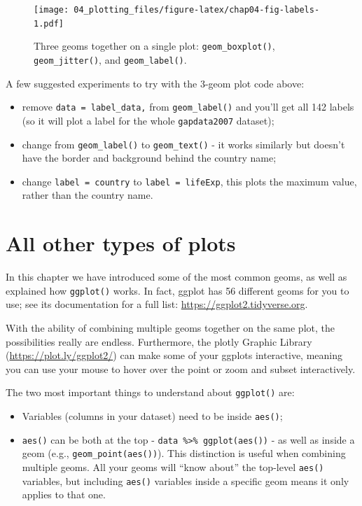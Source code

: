 \documentclass[
  12pt,
  krantz2]{krantz}
\providecommand{\tightlist}{%
  \setlength{\itemsep}{0pt}\setlength{\parskip}{0pt}}
\begin{document}
\begin{figure}
\centering
\texttt{[image: 04\_plotting\_files/figure-latex/chap04-fig-labels-1.pdf]}
\caption{\label{fig:chap04-fig-labels}Three geoms together on a single plot: \texttt{geom\_boxplot()}, \texttt{geom\_jitter()}, and \texttt{geom\_label()}.}
\end{figure}

A few suggested experiments to try with the 3-geom plot code above:

\begin{itemize}
\tightlist
\item
  remove \texttt{data\ =\ label\_data,} from \texttt{geom\_label()} and you'll get all 142 labels (so it will plot a label for the whole \texttt{gapdata2007} dataset);
\item
  change from \texttt{geom\_label()} to \texttt{geom\_text()} - it works similarly but doesn't have the border and background behind the country name;
\item
  change \texttt{label\ =\ country} to \texttt{label\ =\ lifeExp}, this plots the maximum value, rather than the country name.
\end{itemize}

\hypertarget{all-other-types-of-plots}{%
\section{All other types of plots}\label{all-other-types-of-plots}}

In this chapter we have introduced some of the most common geoms, as well as explained how \texttt{ggplot()} works.
In fact, ggplot has 56 different geoms for you to use; see its documentation for a full list: \url{https://ggplot2.tidyverse.org}.

With the ability of combining multiple geoms together on the same plot, the possibilities really are endless.
Furthermore, the plotly Graphic Library (\url{https://plot.ly/ggplot2/}) can make some of your ggplots interactive, meaning you can use your mouse to hover over the point or zoom and subset interactively.

The two most important things to understand about \texttt{ggplot()} are:

\begin{itemize}
\tightlist
\item
  Variables (columns in your dataset) need to be inside \texttt{aes()};
\item
  \texttt{aes()} can be both at the top - \texttt{data\ \%\textgreater{}\%\ ggplot(aes())} - as well as inside a geom (e.g., \texttt{geom\_point(aes())}).
  This distinction is useful when combining multiple geoms.
  All your geoms will ``know about'' the top-level \texttt{aes()} variables, but including \texttt{aes()} variables inside a specific geom means it only applies to that one.
\end{itemize}
\end{document}
